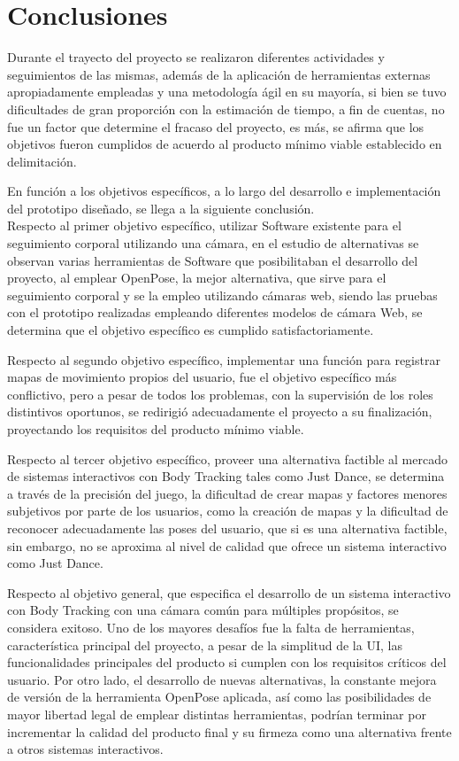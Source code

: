 \chapter{Conclusiones}


Durante el trayecto del proyecto se realizaron diferentes actividades y seguimientos de las mismas, además de la aplicación de herramientas externas apropiadamente empleadas y una metodología ágil en su mayoría, si bien se tuvo dificultades de gran proporción con la estimación de tiempo, a fin de cuentas, no fue un factor que determine el fracaso del proyecto, es más, se afirma que los objetivos fueron cumplidos de acuerdo al producto mínimo viable establecido en delimitación.

En función a los objetivos específicos, a lo largo del desarrollo e implementación del prototipo diseñado, se llega a la siguiente conclusión.
\\

Respecto al primer objetivo específico, utilizar Software existente para el seguimiento corporal utilizando una cámara, en el estudio de alternativas se observan varias herramientas de Software que posibilitaban el desarrollo del proyecto, al emplear OpenPose, la mejor alternativa, que sirve para el seguimiento corporal y se la empleo utilizando cámaras web, siendo las pruebas con el prototipo realizadas empleando diferentes modelos de cámara Web, se determina que el objetivo específico es cumplido satisfactoriamente.

Respecto al segundo objetivo específico, implementar una función para registrar mapas de movimiento propios del usuario, fue el objetivo específico más conflictivo, pero a pesar de todos los problemas, con la supervisión de los roles distintivos oportunos, se redirigió adecuadamente el proyecto a su finalización, proyectando los requisitos del producto mínimo viable.

Respecto al tercer objetivo específico, proveer una alternativa factible al mercado de sistemas interactivos con Body Tracking tales como Just Dance, se determina a través de la precisión del juego, la dificultad de crear mapas y factores menores subjetivos por parte de los usuarios, como la creación de mapas y la dificultad de reconocer adecuadamente las poses del usuario, que si es una alternativa factible, sin embargo, no se aproxima al nivel de calidad que ofrece un sistema interactivo como Just Dance. 

Respecto al objetivo general, que especifica el desarrollo de un sistema interactivo con Body Tracking con una cámara común para múltiples propósitos, se considera exitoso. Uno de los mayores desafíos fue la falta de herramientas, característica principal del proyecto, a pesar de la simplitud de la UI, las funcionalidades principales del producto si cumplen con los requisitos críticos del usuario.
Por otro lado, el desarrollo de nuevas alternativas, la constante mejora de versión de la herramienta OpenPose aplicada, así como las posibilidades de mayor libertad legal de emplear distintas herramientas, podrían terminar por incrementar la calidad del producto final y su firmeza como una alternativa frente a otros sistemas interactivos.

